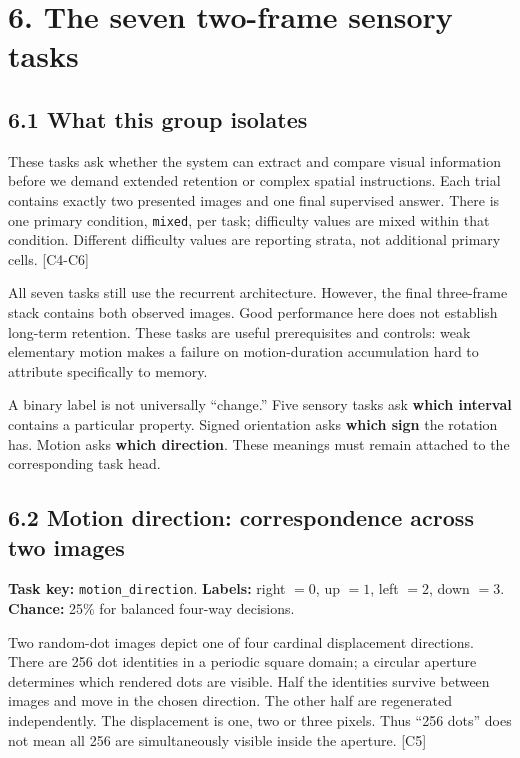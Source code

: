\documentclass[
  11pt,
]{article}
\let\oldsubsection\subsection
\renewcommand{\subsection}{\Needspace{6\baselineskip}\oldsubsection}
\begin{document}
\newpage

\section{6. The seven two-frame sensory
tasks}\label{the-seven-two-frame-sensory-tasks}

\subsection{6.1 What this group
isolates}\label{what-this-group-isolates}

These tasks ask whether the system can extract and compare visual
information before we demand extended retention or complex spatial
instructions. Each trial contains exactly two presented images and one
final supervised answer. There is one primary condition, \texttt{mixed},
per task; difficulty values are mixed within that condition. Different
difficulty values are reporting strata, not additional primary cells.
{[}C4-C6{]}

All seven tasks still use the recurrent architecture. However, the final
three-frame stack contains both observed images. Good performance here
does not establish long-term retention. These tasks are useful
prerequisites and controls: weak elementary motion makes a failure on
motion-duration accumulation hard to attribute specifically to memory.

A binary label is not universally ``change.'' Five sensory tasks ask
\textbf{which interval} contains a particular property. Signed
orientation asks \textbf{which sign} the rotation has. Motion asks
\textbf{which direction}. These meanings must remain attached to the
corresponding task head.

\subsection{6.2 Motion direction: correspondence across two
images}\label{motion-direction-correspondence-across-two-images}

\textbf{Task key:} \texttt{motion\_direction}. \textbf{Labels:} right
\(=0\), up \(=1\), left \(=2\), down \(=3\). \textbf{Chance:} 25\% for
balanced four-way decisions.

Two random-dot images depict one of four cardinal displacement
directions. There are 256 dot identities in a periodic square domain; a
circular aperture determines which rendered dots are visible. Half the
identities survive between images and move in the chosen direction. The
other half are regenerated independently. The displacement is one, two
or three pixels. Thus ``256 dots'' does not mean all 256 are
simultaneously visible inside the aperture. {[}C5{]}
\end{document}
